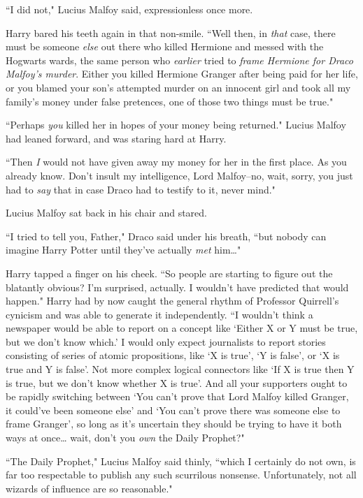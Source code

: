 ``I did not," Lucius Malfoy said, expressionless once more.

Harry bared his teeth again in that non-smile. ``Well then, in \emph{that} case, there must be someone \emph{else} out there who killed Hermione and messed with the Hogwarts wards, the same person who \emph{earlier} tried to \emph{frame Hermione for Draco Malfoy's murder}. Either you killed Hermione Granger after being paid for her life, or you blamed your son's attempted murder on an innocent girl and took all my family's money under false pretences, one of those two things must be true."

``Perhaps \emph{you} killed her in hopes of your money being returned." Lucius Malfoy had leaned forward, and was staring hard at Harry.

``Then \emph{I} would not have given away my money for her in the first place. As you already know. Don't insult my intelligence, Lord Malfoy\---no, wait, sorry, you just had to \emph{say} that in case Draco had to testify to it, never mind."

Lucius Malfoy sat back in his chair and stared.

``I tried to tell you, Father," Draco said under his breath, ``but nobody can imagine Harry Potter until they've actually \emph{met} him{\ldots}"

Harry tapped a finger on his cheek. ``So people are starting to figure out the blatantly obvious? I'm surprised, actually. I wouldn't have predicted that would happen." Harry had by now caught the general rhythm of Professor Quirrell's cynicism and was able to generate it independently. ``I wouldn't think a newspaper would be able to report on a concept like `Either X or Y must be true, but we don't know which.' I would only expect journalists to report stories consisting of series of atomic propositions, like `X is true', `Y is false', or `X is true and Y is false'. Not more complex logical connectors like `If X is true then Y is true, but we don't know whether X is true'. And all your supporters ought to be rapidly switching between `You can't prove that Lord Malfoy killed Granger, it could've been someone else' and `You can't prove there was someone else to frame Granger', so long as it's uncertain they should be trying to have it both ways at once{\ldots} wait, don't you \emph{own} the Daily Prophet?"

``The Daily Prophet," Lucius Malfoy said thinly, ``which I certainly do not own, is far too respectable to publish any such scurrilous nonsense. Unfortunately, not all wizards of influence are so reasonable."


